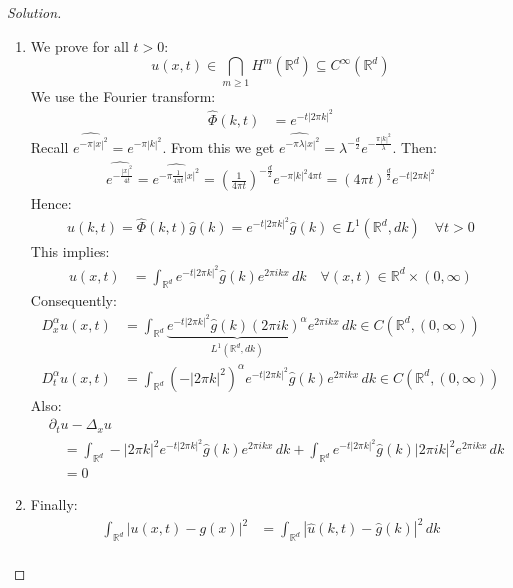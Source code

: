 \documentclass{report}
\theoremstyle{tommy}
\begin{document}
\begin{proof}[Solution]
  \begin{enumerate}[label=\alph*)]
    \item We prove for all \(t > 0\):
    \[u(x,t) \in \bigcap_{m \ge 1} H^m(\mathbb{R}^d) \subseteq C^\infty(\mathbb{R}^d)\]
    We use the Fourier transform:
    \begin{align*}
      \hat \Phi(k,t) &= e^{-t|2 \pi k|^2}
    \end{align*}
    Recall \(\widehat{e^{-\pi |x|^2}} = e^{- \pi |k|^2}\). From this we get \(\widehat{e^{- \pi \lambda |x|^2}} = \lambda^{-\frac{d}{2}} e^{-\frac{\pi |k|^2}{\lambda}}\). Then:
    \begin{align*}
      \widehat{e^{-\frac{|x|^2}{4t}}} = \widehat{e^{-\pi \frac{1}{4 \pi t} |x|^2}} = \left(\frac{1}{4 \pi t}\right)^{-\frac{d}{2}} e^{- \pi |k|^2 4 \pi t} = (4 \pi t)^{\frac{d}{2}} e^{-t |2 \pi k|^2}
    \end{align*}
    Hence:
    \begin{align*}
      \hat u(k,t) = \hat \Phi(k,t) \hat g(k) = e^{-t|2 \pi k|^2} \hat g(k) \in L^1(\mathbb{R}^d, dk) \quad \forall t > 0
    \end{align*}
    This implies:
    \begin{align*}
      u(x,t) &= \int_{\mathbb{R}^d} e^{-t|2 \pi k|^2} \hat g(k) e^{2 \pi i kx} \, dk \quad \forall (x,t) \in \mathbb{R}^d \times (0,\infty)
    \end{align*}
    Consequently:
    \begin{align*}
      D_x^\alpha u(x,t) &= \int_{\mathbb{R}^d} \underbrace{e^{-t|2 \pi k|^2} \hat g(k) (2 \pi ik)^\alpha}_{L^1(\mathbb{R}^d, dk)} e^{2 \pi i k x} \, dk \in C(\mathbb{R}^d, (0,\infty)) \\
      D_t^\alpha u(x,t) &= \int_{\mathbb{R}^d} (-|2\pi k|^2)^\alpha e^{-t|2\pi k|^2} \hat g(k) e^{2 \pi ikx} \, dk \in C(\mathbb{R}^d, (0,\infty))
    \end{align*}
    Also:
    \begin{align*}
      &\partial_t u - \Delta_x u \\&\quad= \int_{\mathbb{R}^d} -|2 \pi k|^2 e^{-t|2 \pi k|^2} \hat g(k) e^{2 \pi i k x} \, dk + \int_{\mathbb{R}^d} e^{-t |2 \pi k|^2} \hat g(k) |2 \pi i k|^2 e^{ 2 \pi i k x} \, dk \\&\quad= 0
    \end{align*}
    \item Finally:
    \begin{align*}
      \int_{\mathbb{R}^d} |u(x,t) - g(x)|^2 &= \int_{\mathbb{R}^d}|\hat u(k,t) - \hat g(k)|^2 \, dk \\

\end{align*}
\end{enumerate}
\end{proof}
\end{document}
